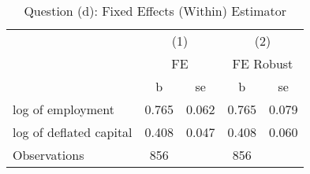 \begin{table}[htbp]\centering
\def\sym#1{\ifmmode^{#1}\else\(^{#1}\)\fi}
\caption{Question (d): Fixed Effects (Within) Estimator}
\begin{tabular}{l*{2}{cc}}
\toprule
                    &\multicolumn{2}{c}{(1)}  &\multicolumn{2}{c}{(2)}  \\
                    &\multicolumn{2}{c}{FE}   &\multicolumn{2}{c}{FE Robust}\\
                    &           b&          se&           b&          se\\
\midrule
log of employment   &       0.765&       0.062&       0.765&       0.079\\
log of deflated capital&       0.408&       0.047&       0.408&       0.060\\
\midrule
Observations        &         856&            &         856&            \\
\bottomrule
\end{tabular}
\end{table}
